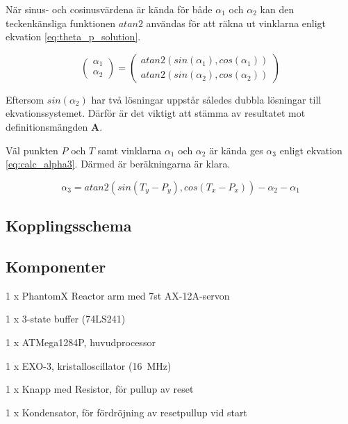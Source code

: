 När sinus- och cosinusvärdena är kända för både $\alpha_{1}$ och $\alpha_{2}$ kan den teckenkänsliga funktionen $atan2$ användas för att räkna ut vinklarna enligt ekvation \ref{eq:theta_p_solution}.

\begin{equation}
	\label{eq:theta_p_solution}
	\begin{pmatrix}
		\alpha_{1}\\
		\alpha_{2}
	\end{pmatrix}
	=
	\begin{pmatrix}
		atan2(sin(\alpha_{1}), cos(\alpha_{1}))\\
		atan2(sin(\alpha_{2}), cos(\alpha_{2}))
	\end{pmatrix}
\end{equation}

Eftersom $sin(\alpha_{2})$ har två lösningar uppstår således dubbla lösningar till ekvationssystemet. Därför är det viktigt att stämma av resultatet mot definitionsmängden $\mathbf{A}$.

Väl punkten $P$ och $T$ samt vinklarna $\alpha_{1}$ och $\alpha_{2}$ är kända ges $\alpha_{3}$ enligt ekvation \ref{eq:calc_alpha3}. Därmed är beräkningarna är klara.

\begin{equation}
	\label{eq:calc_alpha3}
\alpha_{3} = atan2(sin(T_y - P_y), cos(T_x - P_x)) - \alpha_{2} - \alpha_{1}
\end{equation}

\subsection{Kopplingsschema}

\subsection{Komponenter}

\begin{packed_itemize}
\item 1 x PhantomX Reactor arm med 7st AX-12A-servon
\item 1 x 3-state buffer (74LS241)
\item 1 x ATMega1284P, huvudprocessor
\item 1 x EXO-3, kristalloscillator (16~MHz)
\item 1 x Knapp med Resistor, för pullup av reset
\item 1 x Kondensator, för fördröjning av resetpullup vid start
\end{packed_itemize}

